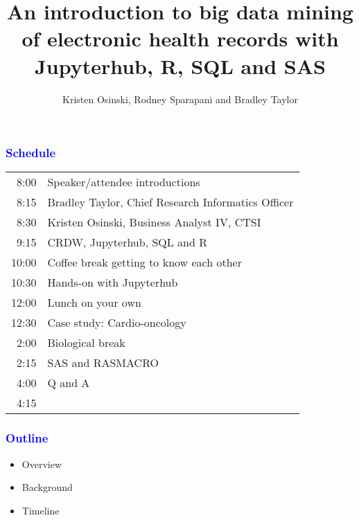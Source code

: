 \documentclass[11pt,pdftex,dvipsnames,usenames]{beamer}
\title{An introduction to big data mining of electronic health records with
Jupyterhub, R, SQL and SAS}
\author{Kristen Osinski, Rodney Sparapani and Bradley Taylor}
\begin{document}


\titlepage
\boldmath

\begin{frame}[fragile]\frametitle{\bf\textcolor{blue}{Schedule}}

\begin{tabular}{rl}
8:00 & Speaker/attendee introductions \\
8:15 & Bradley Taylor, Chief Research Informatics Officer \\
8:30 & Kristen Osinski, Business Analyst IV, CTSI \\
9:15 & CRDW, Jupyterhub, SQL and R \\
10:00& Coffee break getting to know each other \\
10:30& Hands-on with Jupyterhub  \\
12:00& Lunch on your own \\
12:30& Case study: Cardio-oncology \\
2:00 & Biological break \\
2:15 & SAS and RASMACRO \\
4:00 & Q and A \\
4:15 & 
\end{tabular}

\end{frame}

\begin{frame}[fragile]\frametitle{\bf\textcolor{blue}{Outline}}

\begin{itemize}
\item Overview
\item Background
\item Timeline
\end{itemize}

\end{frame}
\end{document}

